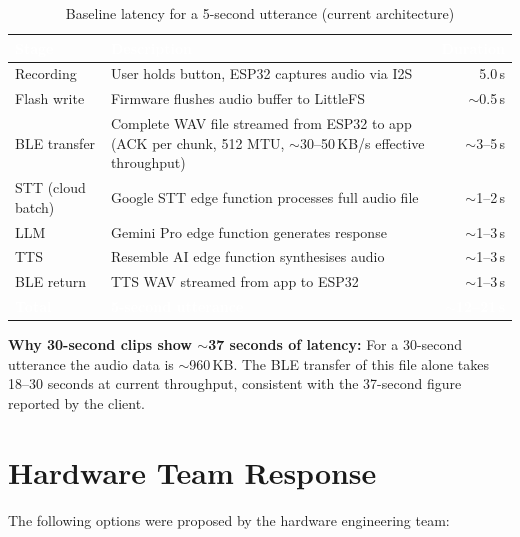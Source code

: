 \documentclass[12pt,a4paper]{article}
\begin{document}
\begin{table}[h!]
\centering
\renewcommand{\arraystretch}{1.4}
\begin{tabularx}{\linewidth}{|l|X|r|}
\hline
\rowcolor{primary}
\textcolor{white}{\textbf{Stage}} &
\textcolor{white}{\textbf{Description}} &
\textcolor{white}{\textbf{Duration}} \\
\hline
Recording          & User holds button, ESP32 captures audio via I2S & 5.0\,s \\
\hline
\rowcolor{rowalt}
Flash write        & Firmware flushes audio buffer to LittleFS        & $\sim$0.5\,s \\
\hline
BLE transfer       & Complete WAV file streamed from ESP32 to app (ACK per chunk, 512 MTU, $\sim$30--50\,KB/s effective throughput) & $\sim$3--5\,s \\
\hline
\rowcolor{rowalt}
STT (cloud batch)  & Google STT edge function processes full audio file & $\sim$1--2\,s \\
\hline
LLM                & Gemini Pro edge function generates response        & $\sim$1--3\,s \\
\hline
\rowcolor{rowalt}
TTS                & Resemble AI edge function synthesises audio        & $\sim$1--3\,s \\
\hline
BLE return         & TTS WAV streamed from app to ESP32                 & $\sim$1--3\,s \\
\hline
\rowcolor{primary}
\textcolor{white}{\textbf{Total}} &
\textcolor{white}{\textbf{5-second utterance}} &
\textcolor{white}{\textbf{$\sim$12--21\,s}} \\
\hline
\end{tabularx}
\caption{Baseline latency for a 5-second utterance (current architecture)}
\end{table}

\begin{constraintbox}
\textbf{Why 30-second clips show $\sim$37 seconds of latency:} For a 30-second utterance the
audio data is $\sim$960\,KB. The BLE transfer of this file alone takes 18--30 seconds at current
throughput, consistent with the 37-second figure reported by the client.
\end{constraintbox}

\section{Hardware Team Response}

The following options were proposed by the hardware engineering team:
\end{document}
